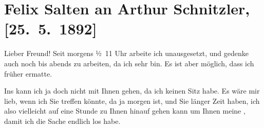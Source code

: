 

\renewcommand{\erwaehntePersonen}{Personen: Leopold Weiss}
\renewcommand{\erwaehnteInstitutionen}{Institutionen: Comédie-Française}
\renewcommand{\erwaehnteOrte}{Orte: Internationales Ausstellungstheater im k.k. Prater, Wien}
\renewcommand{\erwaehnteWerke}{Werke: Anatol, Muza}
\section[Felix Salten an Arthur Schnitzler, {[}25. 5. 1892{]}]{Felix Salten an Arthur Schnitzler, {[}25. 5. 1892{]}}
\nopagebreak{}
\rehead{ }\normalsize\beginnumbering{}
\toendnotes[C]{\smallbreak\pagebreak[2]}
\toendnotes[C]{\smallbreak}
\pstart
           \noindent{}{\pb}Lieber Freund! Seit morgens ½ 11 Uhr
               arbeite ich unausgesetzt, und gedenke auch noch bis abends zu arbeiten,
               da ich sehr \label{K_L03109-1v}\label{K_L03109-1h} bin. Es ist aber möglich, dass ich früher ermatte.\pend
           
\pstart
           Ins \label{K_L03109-2v}\label{K_L03109-2h} kann ich ja doch nicht mit
               Ihnen gehen, da ich keinen Sitz habe. Es wäre mir lieb, wenn ich Sie \label{K_L03109-3v}\label{K_L03109-3h}{\pb}treffen könnte, da \strikeout{\textcolor{gray}{au}} ja morgen{ }\label{K_L03109-4v}\label{K_L03109-4h} ist, und Sie länger Zeit haben,
               ich also vielleicht auf eine Stunde zu Ihnen hinauf gehen kann um Ihnen meine \label{K_L03109-5v}\label{K_L03109-5h}, damit ich die Sache endlich los habe.\pend
           
